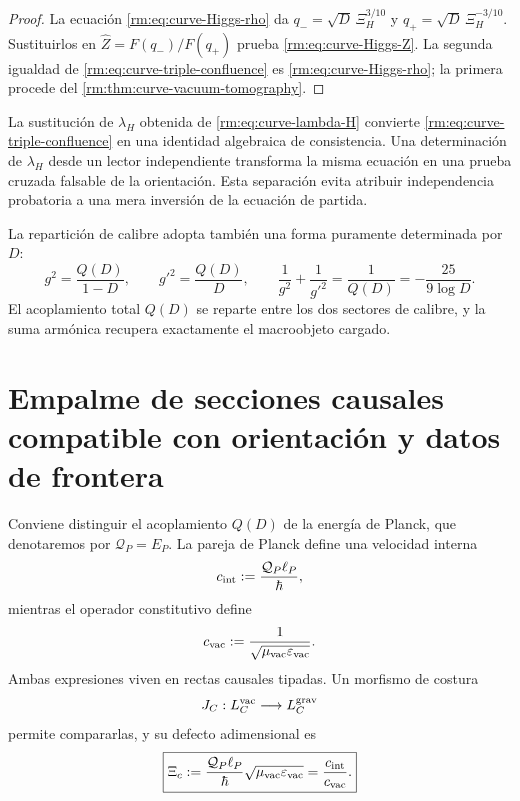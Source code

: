 \begin{proof}
La ecuaci\'on \cref{rm:eq:curve-Higgs-rho} da
\(q_-=\sqrt D\,\Xi_H^{3/10}\) y
\(q_+=\sqrt D\,\Xi_H^{-3/10}\). Sustituirlos en
\(\widehat Z=F(q_-)/F(q_+)\) prueba \cref{rm:eq:curve-Higgs-Z}. La segunda
igualdad de \cref{rm:eq:curve-triple-confluence} es
\cref{rm:eq:curve-Higgs-rho}; la primera procede del
\cref{rm:thm:curve-vacuum-tomography}.
\end{proof}

La sustituci\'on de \(\lambda_H\) obtenida de
\cref{rm:eq:curve-lambda-H} convierte
\cref{rm:eq:curve-triple-confluence} en una identidad algebraica de consistencia.
Una determinaci\'on de \(\lambda_H\) desde un lector independiente transforma
la misma ecuaci\'on en una prueba cruzada falsable de la orientaci\'on. Esta
separaci\'on evita atribuir independencia probatoria a una mera inversi\'on de
la ecuaci\'on de partida.

La repartici\'on de calibre adopta tambi\'en una forma puramente determinada
por \(D\):
\begin{equation}
 g^2=\frac{Q(D)}{1-D},
 \qquad
 g'^2=\frac{Q(D)}D,
 \qquad
 \boxed{
 \frac1{g^2}+\frac1{g'^2}=\frac1{Q(D)}
 =-\frac{25}{9\log D}.}
 \label{rm:eq:curve-gauge-harmonic}
\end{equation}
El acoplamiento total \(Q(D)\) se reparte entre los dos sectores de calibre,
y la suma arm\'onica recupera exactamente el macroobjeto cargado.

\section{Empalme de secciones causales compatible con orientación y datos de frontera}

Conviene distinguir el acoplamiento \(Q(D)\) de la energ\'ia de Planck,
que denotaremos por \(\mathcal Q_P=E_P\). La pareja de Planck define una
velocidad interna
\begin{equation}
 c_{\rm int}:=\frac{\mathcal Q_P\ell_P}{\hbar},
 \label{rm:eq:curve-c-int}
\end{equation}
mientras el operador constitutivo define
\begin{equation}
 c_{\rm vac}:=\frac1{\sqrt{\mu_{\rm vac}\varepsilon_{\rm vac}}}.
 \label{rm:eq:curve-c-vac}
\end{equation}
Ambas expresiones viven en rectas causales tipadas. Un morfismo de costura
\begin{equation}
 J_C:L_C^{\rm vac}\longrightarrow L_C^{\rm grav}
 \label{rm:eq:curve-JC}
\end{equation}
permite compararlas, y su defecto adimensional es
\begin{equation}
 \boxed{
 \Xi_c
 :=\frac{\mathcal Q_P\ell_P}{\hbar}
   \sqrt{\mu_{\rm vac}\varepsilon_{\rm vac}}
 =\frac{c_{\rm int}}{c_{\rm vac}}.}
 \label{rm:eq:curve-Xi-c}
\end{equation}

